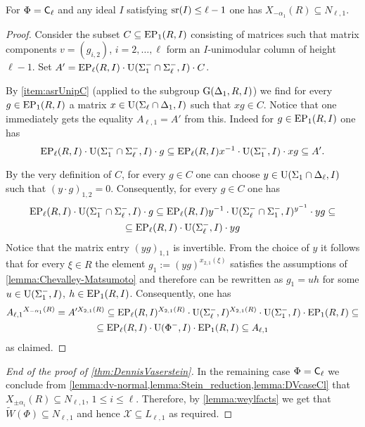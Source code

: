 \begin{lemma} \label{lemma:DVcaseCl}
For $\Phi=\mathsf{C}_\ell$ and any ideal $I$ satisfying $\operatorname{sr}(I) \leq \ell-1$ one has $X_{-\alpha_1}(R) \subseteq N_{\ell, 1}$.
\end{lemma}
\begin{proof}
Consider the subset $C \subseteq \operatorname{EP}_1(R, I)$ consisting of matrices such that matrix components $v=(g_{i,2})$, $i=2,\ldots, \ell$ form an $I$-unimodular column of height $\ell-1$.
Set $A' = \operatorname{EP}_\ell(R, I) \cdot \operatorname{U}(\Sigma_1^- \cap \Sigma_\ell^-, I) \cdot C$.

By \cref{item:asrUnipC} (applied to the subgroup $\operatorname{G}(\Delta_1, R, I)$) we find for every $g \in \operatorname{EP}_1(R, I)$ a matrix $x \in \operatorname{U}(\Sigma_\ell \cap \Delta_1, I)$ such that $xg \in C$.  
Notice that one immediately gets the equality $A_{\ell, 1} = A'$ from this.
Indeed for $g\in \operatorname{EP}_1(R, I)$ one has
\begin{equation*} \operatorname{EP}_\ell(R, I) \cdot \operatorname{U}(\Sigma_1^- \cap \Sigma_\ell^-, I) \cdot g \subseteq 
 \operatorname{EP}_\ell(R, I)x^{-1}  \cdot \operatorname{U}(\Sigma_1^-, I) \cdot xg \subseteq A'. \end{equation*}

By the very definition of $C$, for every $g \in C$ one can choose $y \in \operatorname{U}(\Sigma_1 \cap \Delta_\ell, I)$ such that $(y \cdot g)_{1,2} = 0$.
Consequently, for every $g\in C$ one has
\begin{multline*}
 \operatorname{EP}_\ell(R, I) \cdot \operatorname{U}(\Sigma_1^- \cap \Sigma_\ell^-, I) \cdot g \subseteq \operatorname{EP}_\ell(R, I) y^{-1} \cdot \operatorname{U}(\Sigma_\ell^-\cap \Sigma_1^-, I)^{y^{-1}} \cdot y g \subseteq \\
  \subseteq \operatorname{EP}_\ell(R, I) \cdot \operatorname{U}(\Sigma_\ell^-, I) \cdot y g
\end{multline*}
Notice that the matrix entry $(yg)_{1,1}$ is invertible.
From the choice of $y$ it follows that for every $\xi\in R$ the element $g_1:=(yg)^{x_{2,1}(\xi)}$
satisfies the assumptions of \cref{lemma:Chevalley-Matsumoto} and therefore can be rewritten as $g_1 = uh$ for some $u \in \operatorname{U}(\Sigma_1^-, I)$, $h \in \operatorname{EP}_1(R, I)$.
Consequently, one has
\begin{multline*} {A_{\ell,1}}^{X_{-\alpha_1}(R)} = A'^{X_{2,1}(R)} \subseteq \operatorname{EP}_\ell(R, I)^{X_{2,1}(R)} \cdot \operatorname{U}(\Sigma_\ell^-, I)^{X_{2,1}(R)} \cdot \operatorname{U}(\Sigma_1^-, I) \cdot \operatorname{EP}_1(R, I) \subseteq \\
 \subseteq \operatorname{EP}_\ell(R, I) \cdot \operatorname{U}(\Phi^-, I) \cdot \operatorname{EP}_1(R, I) \subseteq A_{\ell,1} \end{multline*}
 as claimed.
\end{proof}

\begin{proof}[End of the proof of \cref{thm:DennisVaserstein}]
In the remaining case $\Phi=\mathsf{C}_\ell$ we conclude from \cref{lemma:dv-normal,lemma:Stein_reduction,lemma:DVcaseCl} that $X_{\pm \alpha_i}(R) \subseteq N_{\ell,1}$, $1\leq i\leq \ell$.
Therefore, by \cref{lemma:weylfacts} we get that $\widetilde{W}(\Phi) \subseteq N_{\ell,1}$ and hence $\mathcal{X} \subseteq L_{\ell,1}$ as required.
\end{proof}
